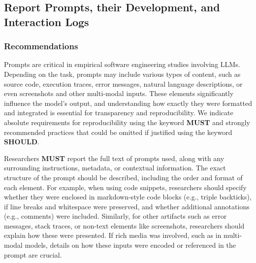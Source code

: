 



\subsection{Report Prompts, their Development, and Interaction Logs}



\subsubsection{Recommendations}
Prompts are critical in empirical software engineering studies involving LLMs. Depending on the task, prompts may include various types of content, such as source code, execution traces, error messages, natural language descriptions, or even screenshots and other multi-modal inputs. These elements significantly influence the model’s output, and understanding how exactly they were formatted and integrated is essential for transparency and reproducibility. We indicate absolute requirements for reproducibility using the keyword \textbf{MUST} and strongly recommended practices that could be omitted if justified using the keyword \textbf{SHOULD}.

Researchers \textbf{MUST} report the full text of prompts used, along with any surrounding instructions, metadata, or contextual information. The exact structure of the prompt should be described, including the order and format of each element. For example, when using code snippets, researchers should specify whether they were enclosed in markdown-style code blocks (e.g., triple backticks), if line breaks and whitespace were preserved, and whether additional annotations (e.g., comments) were included. Similarly, for other artifacts such as error messages, stack traces, or non-text elements like screenshots, researchers should explain how these were presented. If rich media was involved, such as in multi-modal models, details on how these inputs were encoded or referenced in the prompt are crucial.

